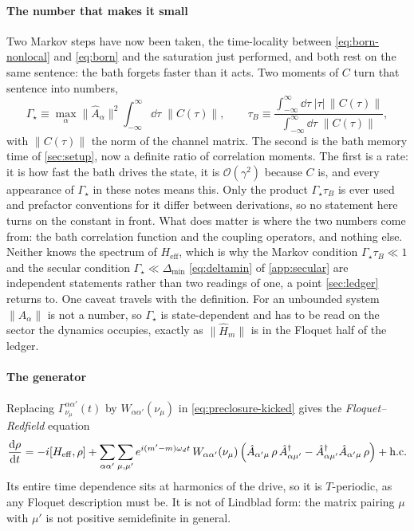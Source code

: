 \documentclass[a4paper,11pt]{article}
\newcommand{\eff}{\mathrm{eff}}
\begin{document}
\paragraph{The number that makes it small}
Two Markov steps have now been taken, the time-locality between \eqref{eq:born-nonlocal} and \eqref{eq:born} and the saturation just performed, and both rest on the same sentence: the bath forgets faster than it acts. Two moments of $C$ turn that sentence into numbers,
\begin{equation}\label{eq:markovpair}
  \Gamma_{\!\star} \equiv \max_\alpha\lVert\hat A_\alpha\rVert^2
    \int_{-\infty}^{\infty}\!\dd\tau\;\lVert C(\tau)\rVert,
  \qquad
  \tau_B \equiv \frac{\int_{-\infty}^{\infty}\!\dd\tau\;\lvert\tau\rvert\,\lVert C(\tau)\rVert}
                     {\int_{-\infty}^{\infty}\!\dd\tau\;\lVert C(\tau)\rVert},
\end{equation}
with $\lVert C(\tau)\rVert$ the norm of the channel matrix. The second is the bath memory time of \cref{sec:setup}, now a definite ratio of correlation moments. The first is a rate: it is how fast the bath drives the state, it is $\mathcal O(\gamma^2)$ because $C$ is, and every appearance of $\Gamma_{\!\star}$ in these notes means this. Only the product $\Gamma_{\!\star}\tau_B$ is ever used and prefactor conventions for it differ between derivations, so no statement here turns on the constant in front. What does matter is where the two numbers come from: the bath correlation function and the coupling operators, and nothing else. Neither knows the spectrum of $H_\eff$, which is why the Markov condition $\Gamma_{\!\star}\tau_B\ll1$ and the secular condition $\Gamma_{\!\star}\ll\Delta_{\min}$ \eqref{eq:deltamin} of \cref{app:secular} are independent statements rather than two readings of one, a point \cref{sec:ledger} returns to. One caveat travels with the definition. For an unbounded system $\lVert\hat A_\alpha\rVert$ is not a number, so $\Gamma_{\!\star}$ is state-dependent and has to be read on the sector the dynamics occupies, exactly as $\lVert\hat H_m\rVert$ is in the Floquet half of the ledger.

\paragraph{The generator}
Replacing $\Gamma^{\alpha\alpha'}_{\nu_\mu}(t)$ by $W_{\alpha\alpha'}(\nu_\mu)$ in \eqref{eq:preclosure-kicked} gives the \emph{Floquet--Redfield} equation
\begin{equation}\label{eq:redfield}
  \dv{\rho}{t}
  = -i\comm{H_\eff}{\rho}
  + \sum_{\alpha\alpha'}\sum_{\mu,\mu'} e^{i(m'-m)\omega_d t}\,W_{\alpha\alpha'}(\nu_\mu)\,
  \Big( \hat A_{\alpha'\mu}\,\rho\,\hat A_{\alpha\mu'}^\dagger
  - \hat A_{\alpha\mu'}^\dagger \hat A_{\alpha'\mu}\,\rho \Big) + \mathrm{h.c.}
\end{equation}
Its entire time dependence sits at harmonics of the drive, so it is $T$-periodic, as any Floquet description must be. It is not of Lindblad form: the matrix pairing $\mu$ with $\mu'$ is not positive semidefinite in general.
\end{document}
